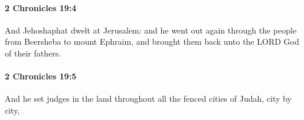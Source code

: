 		\paragraph{2 Chronicles 19:4} %
			\label{2CHRONICLES-19-4}

			And Jehoshaphat dwelt at Jerusalem: and he went out again through the people from Beersheba to mount Ephraim, and brought them back unto the LORD God of their fathers.


		\paragraph{2 Chronicles 19:5} %
			\label{2CHRONICLES-19-5}

			And he set judges in the land throughout all the fenced cities of Judah, city by city,


